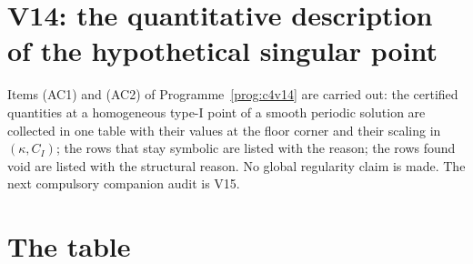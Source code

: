 \documentclass[11pt]{article}
\theoremstyle{plain}
\theoremstyle{definition}
\theoremstyle{remark}
\begin{document}
\section{V14: the quantitative description of the hypothetical singular point}
\label{sec:c4v14-entry}

Items (AC1) and (AC2) of Programme~\ref{prog:c4v14} are carried out:
the certified quantities at a homogeneous type-I point of a smooth
periodic solution are collected in one table with their values at
the floor corner and their scaling in \((\kappa,C_I)\); the rows that stay
symbolic are listed with the reason; the rows found void are listed
with the structural reason.  No global regularity claim is made.  The
next compulsory companion audit is V15.

\section{The table}
\label{sec:c4v14-table}
\end{document}
